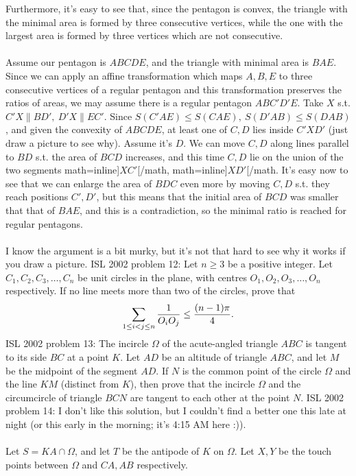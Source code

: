 Furthermore, it's easy to see that, since the pentagon is convex, the triangle with the minimal area is formed by three consecutive vertices, while the one with the largest area is formed by three vertices which are not consecutive. \\\\
Assume our pentagon is $ABCDE$, and the triangle with minimal area is $BAE$. Since we can apply an affine transformation which maps $A,B,E$ to three consecutive vertices of a regular pentagon and this transformation preserves the ratios of areas, we may assume there is a regular pentagon $ABC'D'E$. Take $X$ s.t. $C'X\|BD',\ D'X\|EC'$. Since $S(C'AE)\le S(CAE),\ S(D'AB)\le S(DAB)$, and given the convexity of $ABCDE$, at least one of $C,D$ lies inside $C'XD'$ (just draw a picture to see why). Assume it's $D$. We can move $C,D$ along lines parallel to $BD$ s.t. the area of $BCD$ increases, and this time $C,D$ lie on the union of the two segments math=inline]$XC'$[/math, math=inline]$XD'$[/math. It's easy now to see that we can enlarge the area of $BDC$ even more by moving $C,D$ s.t. they reach positions $C',D'$, but this means that the initial area of $BCD$ was smaller that that of $BAE$, and this is a contradiction, so the minimal ratio is reached for regular pentagons. \\\\
I know the argument is a bit murky, but it's not that hard to see why it works if you draw a picture. 
ISL 2002 problem 12:  Let $n\geq3$ be a positive integer. Let $C_1,C_2,C_3,\ldots,C_n$ be unit circles in the plane, with centres $O_1,O_2,O_3,\ldots,O_n$ respectively. If no line meets more than two of the circles, prove that
\[ \sum\limits^{}_{1\leq i<j\leq n}{1\over O_iO_j}\leq{(n-1)\pi\over 4}. \] 
ISL 2002 problem 13:  The incircle $ \Omega$ of the acute-angled triangle $ ABC$ is tangent to its side $ BC$ at a point $ K$. Let $ AD$ be an altitude of triangle $ ABC$, and let $ M$ be the midpoint of the segment $ AD$. If $ N$ is the common point of the circle $ \Omega$ and the line $ KM$ (distinct from $ K$), then prove that the incircle $ \Omega$ and the circumcircle of triangle $ BCN$ are tangent to each other at the point $ N$. 
ISL 2002 problem 14:  I don't like this solution, but I couldn't find a better one this late at night (or this early in the morning; it's 4:15 AM here :)). \\\\
Let $S=KA\cap \Omega$, and let $T$ be the antipode of $K$ on $\Omega$. Let $X,Y$ be the touch points between $\Omega$ and $CA,AB$ respectively. \\\\
